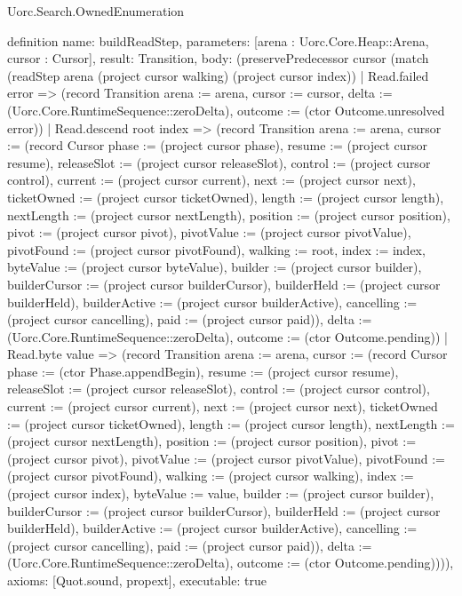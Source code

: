 \begin{lexlean}{Uorc.Search.OwnedEnumeration}
\begin{semanticmodule}
definition{
  name: buildReadStep,
  parameters: [arena : Uorc.Core.Heap::Arena, cursor : Cursor],
  result: Transition,
  body: (preservePredecessor cursor (match (readStep arena (project cursor walking) (project cursor index))
    | Read.failed error => (record Transition {arena := arena, cursor := cursor, delta := (Uorc.Core.RuntimeSequence::zeroDelta), outcome := (ctor Outcome.unresolved error)})
    | Read.descend root index => (record Transition {arena := arena, cursor := (record Cursor {phase := (project cursor phase), resume := (project cursor resume), releaseSlot := (project cursor releaseSlot), control := (project cursor control), current := (project cursor current), next := (project cursor next), ticketOwned := (project cursor ticketOwned), length := (project cursor length), nextLength := (project cursor nextLength), position := (project cursor position), pivot := (project cursor pivot), pivotValue := (project cursor pivotValue), pivotFound := (project cursor pivotFound), walking := root, index := index, byteValue := (project cursor byteValue), builder := (project cursor builder), builderCursor := (project cursor builderCursor), builderHeld := (project cursor builderHeld), builderActive := (project cursor builderActive), cancelling := (project cursor cancelling), paid := (project cursor paid)}), delta := (Uorc.Core.RuntimeSequence::zeroDelta), outcome := (ctor Outcome.pending)})
    | Read.byte value => (record Transition {arena := arena, cursor := (record Cursor {phase := (ctor Phase.appendBegin), resume := (project cursor resume), releaseSlot := (project cursor releaseSlot), control := (project cursor control), current := (project cursor current), next := (project cursor next), ticketOwned := (project cursor ticketOwned), length := (project cursor length), nextLength := (project cursor nextLength), position := (project cursor position), pivot := (project cursor pivot), pivotValue := (project cursor pivotValue), pivotFound := (project cursor pivotFound), walking := (project cursor walking), index := (project cursor index), byteValue := value, builder := (project cursor builder), builderCursor := (project cursor builderCursor), builderHeld := (project cursor builderHeld), builderActive := (project cursor builderActive), cancelling := (project cursor cancelling), paid := (project cursor paid)}), delta := (Uorc.Core.RuntimeSequence::zeroDelta), outcome := (ctor Outcome.pending)}))),
  axioms: [Quot.sound, propext],
  executable: true
}


\end{semanticmodule}
\end{lexlean}
